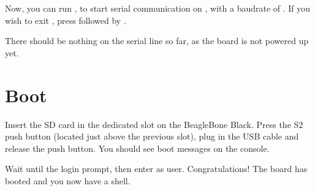 Now, you can run , to start serial
communication on , with a baudrate of . If
you wish to exit , press \code{[Ctrl][a]} followed by
\code{[Ctrl][x]}.

There should be nothing on the serial line so far, as the board is not
powered up yet.

\section{Boot}

Insert the SD card in the dedicated slot on the BeagleBone Black. Press the S2
push button (located just above the previous slot), plug in the USB cable and
release the push button. You should see boot messages on the console.

Wait until the login prompt, then enter  as user.
Congratulations! The board has booted and you now have a shell.
